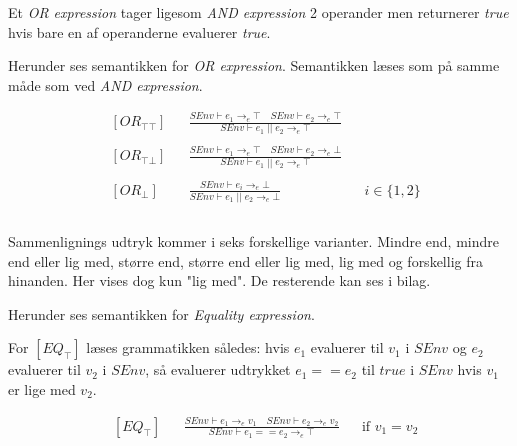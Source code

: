 Et \textit{OR expression} tager ligesom \textit{AND expression} 2 operander men returnerer \textit{true} hvis bare en af operanderne evaluerer \textit{true}. 

\noindent Herunder ses semantikken for \textit{OR expression}. Semantikken læses som på samme måde som ved \textit{AND expression}.

\begin{align*}
&[OR_{\top\top}] & &\frac{SEnv \vdash e_1 \rightarrow_e \top \quad SEnv \vdash e_2 \rightarrow_e \top}{SEnv \vdash e_1\; ||\; e_2 \rightarrow_e \top}\\\\
&[OR_{\top\bot}] & &\frac{SEnv \vdash e_1 \rightarrow_e \top \quad SEnv \vdash e_2 \rightarrow_e \bot}{SEnv \vdash e_1\; ||\; e_2 \rightarrow_e \top}\\\\
&[OR_\bot] & &\frac{SEnv \vdash e_i \rightarrow_e \bot}{SEnv \vdash e_1 \;||\; e_2 \rightarrow_e \bot} & &i \in \{1, 2\}\\\\
\end{align*}

Sammenlignings udtryk kommer i seks forskellige varianter. Mindre end, mindre end eller lig med, større end, større end eller lig med, lig med og forskellig fra hinanden. Her vises dog kun "lig med". De resterende kan ses i bilag.

\noindent Herunder ses semantikken for \textit{Equality expression}. 

\noindent For $[EQ_\top]$ læses grammatikken således: hvis $e_1$ evaluerer til $v_1$ i $SEnv$ og $e_2$ evaluerer til $v_2$ i $SEnv$, så evaluerer udtrykket $e_1 == e_2$ til $true$ i $SEnv$ hvis $v_1$ er lige med $v_2$.

\begin{align*}
&[EQ_\top] & &\frac{SEnv \vdash e_1 \rightarrow_e v_1 \quad SEnv \vdash e_2 \rightarrow_e v_2}{SEnv \vdash e_1 == e_2 \rightarrow_e \top} & &\text{if } v_1 = v_2\\\\
\end{align*}

